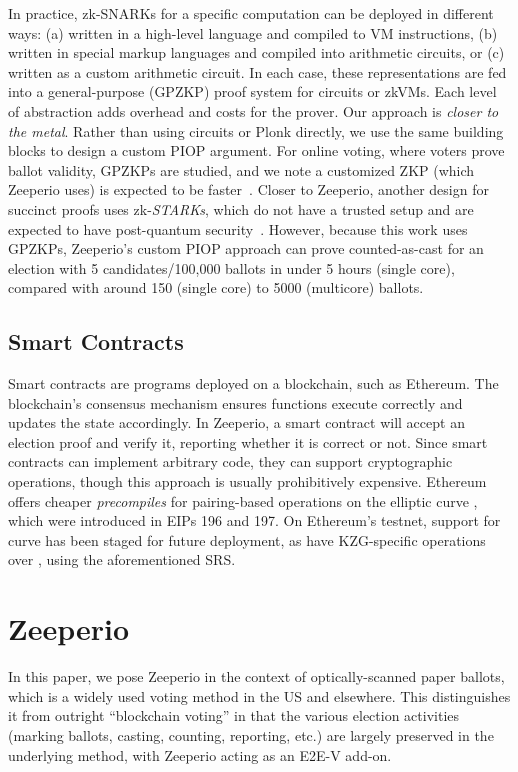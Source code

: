 In practice, zk-SNARKs for a specific computation can be deployed in different ways: (a) written in a high-level language and compiled to VM instructions, (b) written in special markup languages and compiled into arithmetic circuits, or (c) written as a custom arithmetic circuit. 
In each case, these representations are fed into a general-purpose (GPZKP) proof system for circuits or zkVMs. 
Each level of abstraction adds overhead and costs for the prover. 
Our approach is \emph{closer to the metal}. 
Rather than using circuits or Plonk directly, we use the same building blocks to design a custom PIOP argument. For online voting, where voters prove ballot validity, GPZKPs are studied, and we note a customized ZKP (which Zeeperio uses) is expected to be faster~\cite{HKJR24}. 
Closer to Zeeperio, another design for succinct proofs uses zk-{\em STARKs}, which do not have a trusted setup and are expected to have post-quantum security~\cite{HT25}. 
However, because this work uses GPZKPs, Zeeperio's custom PIOP approach can prove counted-as-cast for an election with 5 candidates/100,000 ballots in under 5 hours (single core), compared with around 150 (single core) to 5000 (multicore) ballots.

\subsection{Smart Contracts}

Smart contracts are programs deployed on a blockchain, such as Ethereum. 
The blockchain's consensus mechanism ensures functions execute correctly and updates the state accordingly. 
In Zeeperio, a smart contract will accept an election proof and verify it, reporting whether it is correct or not. 
Since smart contracts can implement arbitrary code, they can support cryptographic operations, though this approach is usually prohibitively expensive. 
Ethereum offers cheaper \emph{precompiles} for pairing-based operations on the elliptic curve \altbn, which were introduced in EIPs 196 and 197.
On Ethereum's testnet, support for curve \bls has been staged for future deployment, as have KZG-specific operations over \bls, using the aforementioned SRS.

\section{Zeeperio}
\label{sec:constraints} 

In this paper, we pose Zeeperio in the context of optically-scanned paper ballots, which is a widely used voting method in the US and elsewhere. This distinguishes it from outright ``blockchain voting'' in that the various election activities (marking ballots, casting, counting, reporting, etc.) are largely preserved in the underlying method, with Zeeperio acting as an E2E-V add-on.

